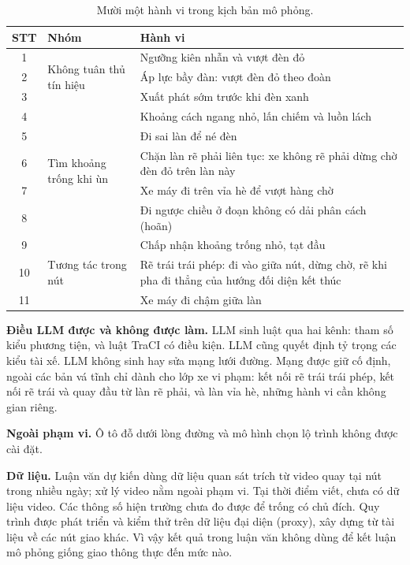 \documentclass[../DoAn.tex]{subfiles}
\begin{document}
\begin{table}[ht]
\centering
\caption{Mười một hành vi trong kịch bản mô phỏng.}
\label{table:1.1}
\begin{tabular}{|c|p{3.2cm}|p{8cm}|}
\hline
\textbf{STT} & \textbf{Nhóm} & \textbf{Hành vi} \\
\hline
1 & \multirow{3}{3.2cm}{Không tuân thủ tín hiệu} & Ngưỡng kiên nhẫn và vượt đèn đỏ \\
2 & & Áp lực bầy đàn: vượt đèn đỏ theo đoàn \\
3 & & Xuất phát sớm trước khi đèn xanh \\
\hline
4 & \multirow{5}{3.2cm}{Tìm khoảng trống khi ùn} & Khoảng cách ngang nhỏ, lấn chiếm và luồn lách \\
5 & & Đi sai làn để né đèn \\
6 & & Chặn làn rẽ phải liên tục: xe không rẽ phải dừng chờ đèn đỏ trên làn này \\
7 & & Xe máy đi trên vỉa hè để vượt hàng chờ \\
8 & & Đi ngược chiều ở đoạn không có dải phân cách (hoãn) \\
\hline
9 & \multirow{3}{3.2cm}{Tương tác trong nút} & Chấp nhận khoảng trống nhỏ, tạt đầu \\
10 & & Rẽ trái trái phép: đi vào giữa nút, dừng chờ, rẽ khi pha đi thẳng của hướng đối diện kết thúc \\
11 & & Xe máy đi chậm giữa làn \\
\hline
\end{tabular}
\end{table}

\textbf{Điều LLM được và không được làm.} LLM sinh luật qua hai kênh: tham số kiểu phương tiện, và luật TraCI có điều kiện. LLM cũng quyết định tỷ trọng các kiểu tài xế. LLM không sinh hay sửa mạng lưới đường. Mạng được giữ cố định, ngoài các bản vá tĩnh chỉ dành cho lớp xe vi phạm: kết nối rẽ trái trái phép, kết nối rẽ trái và quay đầu từ làn rẽ phải, và làn vỉa hè, những hành vi cần không gian riêng.

\textbf{Ngoài phạm vi.} Ô tô đỗ dưới lòng đường và mô hình chọn lộ trình không được cài đặt.

\textbf{Dữ liệu.} Luận văn dự kiến dùng dữ liệu quan sát trích từ video quay tại nút trong nhiều ngày; xử lý video nằm ngoài phạm vi. Tại thời điểm viết, chưa có dữ liệu video. Các thông số hiện trường chưa đo được để trống có chủ đích. Quy trình được phát triển và kiểm thử trên dữ liệu đại diện (proxy), xây dựng từ tài liệu về các nút giao khác. Vì vậy kết quả trong luận văn không dùng để kết luận mô phỏng giống giao thông thực đến mức nào.
\end{document}
